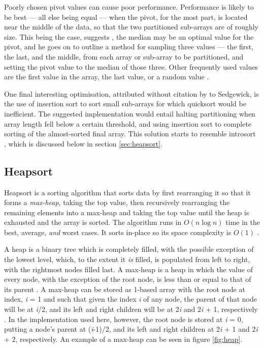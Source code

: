 \documentclass[12pt, a4paper]{article}
\begin{document}
Poorly chosen pivot values can cause poor performance. Performance is likely to be best — all else being equal — when the pivot, for the most part, is located near the middle of the data, so that the two partitioned sub-arrays are of roughly size. This being the case, suggests \textcite[851]{Sedgewick-1978}, the median may be an optimal value for the pivot, and he goes on to outline a method for sampling three values — the first, the last, and the middle, from each array or sub-array to be partitioned, and setting the pivot value to the median of those three. Other frequently used values are the first value in the array, the last value, or a random value \autocite*[73]{heineman2016algorithms}.

One final interesting optimisation, attributed without citation by \textcite[121]{bentley:pearls} to Sedgewick, is the use of insertion sort to sort small sub-arrays for which quicksort would be inefficient. The suggested implementation would entail halting partitioning when array length fell below a certain threshold, and using insertion sort to complete sorting of the almost-sorted final array. This solution starts to resemble introsort \autocite{musser1997}, which is discussed below in section \ref{sec:heapsort}.


\subsection{Heapsort}

Heapsort is a sorting algorithm that sorts data by first rearranging it so that it forms a \emph{max-heap}, taking the top value, then recursively rearranging the remaining elements into a max-heap and taking the top value until the heap is exhausted and the array is sorted. The algorithm runs in $O(n\log n)$ time in the best, average, \emph{and} worst cases. It sorts in-place so its space complexity is $O(1)$ \autocite[129]{cormen01}.

A heap is a binary tree which is completely filled, with the possible exception of the lowest level, which, to the extent it  \emph{is} filled, is populated from left to right, with the rightmost nodes filled last. A max-heap is a heap in which the value of every node, with the exception of the root node, is less than or equal to that of its parent \autocite[127-129]{cormen01}. A max-heap can be stored as 1-based array with the root node at index, \emph{i} = 1 and such that given the index \emph{i} of any node, the parent of that node will be at \emph{i}/2, and its left and right children will be at 2\emph{i} and 2\emph{i} + 1, respectively \autocites[128]{cormen01}[148]{bentley:pearls}. In the implementation used here, however, the root node is stored at \emph{i} = 0, putting a node's parent at (\emph{i}-1)/2, and its left and right children at 2\emph{i} + 1 and 2\emph{i} + 2, respectively. An example of a max-heap can be seen in figure \ref{fig:heap}.
\end{document}

